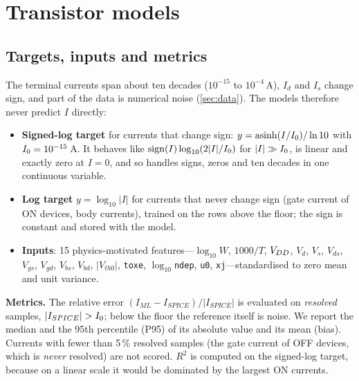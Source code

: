 \section{Transistor models}\label{sec:models}

\subsection{Targets, inputs and metrics}\label{sec:metrics}
The terminal currents span about ten decades ($10^{-15}$ to $10^{-4}$\,A), $I_d$ and $I_s$ change sign, and part of the data is numerical noise
(\cref{sec:data}). The models therefore never predict $I$ directly:
\begin{itemize}
  \item \textbf{Signed-log target} for currents that change sign: $y=\operatorname{asinh}(I/I_{0})/\ln 10$ with $I_{0}=10^{-15}$\,A. It behaves like
        $\operatorname{sign}(I)\log_{10}(2|I|/I_{0})$ for $|I|\gg I_{0}$, is linear and exactly zero at $I=0$, and so handles signs, zeros and ten decades
        in one continuous variable.
  \item \textbf{Log target} $y=\log_{10}|I|$ for currents that never change sign (gate current of ON devices, body currents), trained on the rows
        above the floor; the sign is constant and stored with the model.
  \item \textbf{Inputs}: 15 physics-motivated features---$\log_{10}W$, $1000/T$, $V_{DD}$, $V_d$, $V_s$, $V_{ds}$, $V_{gs}$, $V_{gd}$, $V_{bs}$, $V_{bd}$,
        $|V_{th0}|$, \texttt{toxe}, $\log_{10}$\texttt{ndep}, \texttt{u0}, \texttt{xj}---standardised to zero mean and unit variance.
\end{itemize}
\textbf{Metrics.} The relative error $(I_{ML}-I_{SPICE})/|I_{SPICE}|$ is evaluated on \emph{resolved} samples, $|I_{SPICE}|>\Ifl$; below the floor
the reference itself is noise. We report the median and the 95th percentile (P95) of its absolute value and its mean (bias). Currents with fewer
than 5\,\% resolved samples (the gate current of OFF devices, which is \emph{never} resolved) are not scored. $R^2$ is computed on the signed-log
target, because on a linear scale it would be dominated by the largest ON currents.

